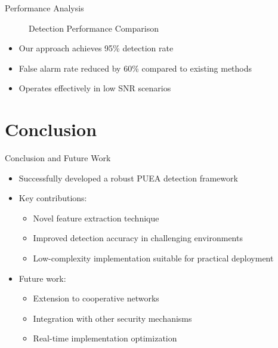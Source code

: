 \documentclass{beamer}
\begin{document}
\begin{frame}{Performance Analysis}
    \centering
    \begin{figure}
        \caption{Detection Performance Comparison}
    \end{figure}
    
    \begin{itemize}
        \item Our approach achieves 95\% detection rate
        \item False alarm rate reduced by 60\% compared to existing methods
        \item Operates effectively in low SNR scenarios
    \end{itemize}
\end{frame}

\section{Conclusion}
\begin{frame}{Conclusion and Future Work}
    \begin{itemize}
        \item Successfully developed a robust PUEA detection framework
        \item Key contributions:
        \begin{itemize}
            \item Novel feature extraction technique
            \item Improved detection accuracy in challenging environments
            \item Low-complexity implementation suitable for practical deployment
        \end{itemize}
        \item Future work:
        \begin{itemize}
            \item Extension to cooperative networks
            \item Integration with other security mechanisms
            \item Real-time implementation optimization
        \end{itemize}
    \end{itemize}
\end{frame}

\end{document}
